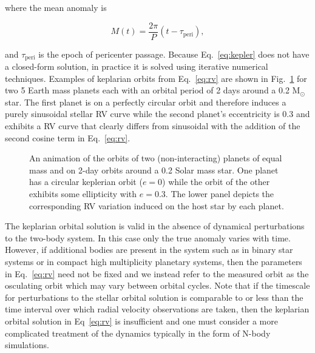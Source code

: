 \noindent where the mean anomaly is

\begin{equation}
M(t) = \frac{2\pi}{P} (t-\tau_{\mathrm{peri}}), 
\end{equation}

\noindent and $\tau_{\mathrm{peri}}$ is the epoch of 
pericenter passage. Because Eq.~\ref{eq:kepler} does not have a closed-form 
solution, in practice it is solved using iterative numerical techniques. 
Examples of keplarian orbits from Eq.~\ref{eq:rv} are shown in Fig.~\ref{fig:rv} 
for two 5 Earth mass planets each with an orbital period of 2 days around a 0.2 M$_{\odot}$ 
star. The first planet is on a perfectly circular orbit and therefore induces a purely
sinusoidal stellar RV curve while the second planet's eccentricity is 0.3 and exhibits a
RV curve that clearly differs from sinusoidal with the addition of the second cosine term in
Eq.~\ref{eq:rv}. \\



\begin{figure}
  \centering
  \caption{An animation of the orbits of two (non-interacting) planets of equal
    mass and on 2-day orbits around a 0.2 Solar mass star. One planet has a circular
    keplerian orbit ($e=0$) while the orbit of the other exhibits some ellipticity with
    $e=0.3$. The lower panel depicts the corresponding RV variation induced on the host star
    by each planet.}
  \label{fig:rv}
\end{figure}

The keplarian orbital solution is valid in the absence of dynamical 
perturbations to the two-body system. In this case only the true anomaly varies with 
time. However, if additional bodies are present in the system such as in binary star 
systems or in compact high multiplicity planetary systems, then the parameters in 
Eq.~\ref{eq:rv} need not be fixed and we instead refer to the measured orbit as the 
osculating orbit which may vary between orbital cycles. Note that if the timescale 
for perturbations to the stellar orbital solution is comparable to or less than the 
time interval over which radial velocity observations are taken, then the keplarian 
orbital solution in Eq~\ref{eq:rv} is insufficient and one must consider a more
complicated treatment of the dynamics typically in the form of N-body simulations.


